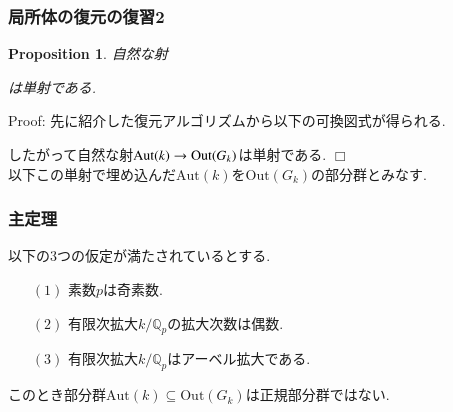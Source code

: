 \documentclass[dvipdfmx,19.8pt]{beamer}
\newcommand{\Blue}{\color{blue}}
\def\qed{\hfill $\Box$}
\theoremstyle{theorem}
\newtheorem{prop}[theorem]{Proposition}
\theoremstyle{definition}
\def\Aut{{\mathrm{Aut}}}
\def\Out{{\mathrm{Out}}}
\begin{document}
\begin{frame}[fragile]
	\frametitle{局所体の復元の復習2}

\begin{prop}\label{injective:prop}
自然な射 
\begin{center}
\end{center}
は単射である. 
\end{prop}
{\Blue Proof:}
先に紹介した復元アルゴリズムから以下の可換図式が得られる. 
\begin{center}
\end{center}
したがって自然な射${\rm Aut}(k) \rightarrow {\rm Out}(G_k)$は単射である. 
\qed \\ 
以下この単射で埋め込んだ$\Aut(k)$を$\Out(G_k)$の部分群とみなす. 
\end{frame}









\begin{frame}[fragile]

  \frametitle{主定理}

\begin{theorem}
以下の3つの仮定が満たされているとする. 
\begin{itemize}
\item[$(1)$]
素数$p$は奇素数.   
\item[$(2)$]
有限次拡大$k / \mathbb{Q}_p$の拡大次数は偶数. 
\item[$(3)$]
有限次拡大$k / \mathbb{Q}_p$はアーベル拡大である. 
\end{itemize}
このとき部分群$\mathrm{Aut}(k) \subseteq \mathrm{Out}(G_k)$は正規部分群ではない.  
\end{theorem}


\end{frame}
\end{document}
